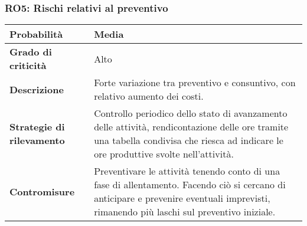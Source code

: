 \noindent\begin{minipage}{\textwidth}
\subsubsection{RO5: Rischi relativi al preventivo}
    
\bgroup
\begin{adjustwidth}{-0.5cm}{-0.5cm}
    \begin{longtable}{P{4.5cm}|>{\justifying \arraybackslash}P{9cm}}

        \textbf{Probabilità} & Media \\
        \hline
        \textbf{Grado di criticità} & Alto \\
        \hline
        \textbf{Descrizione} & Forte variazione tra preventivo e consuntivo, con relativo aumento
        dei costi. \\
        \hline
        \textbf{Strategie di rilevamento} &  Controllo periodico dello stato di avanzamento delle
        attività, rendicontazione delle ore tramite una tabella condivisa che riesca ad indicare le ore produttive svolte nell'attività. \\
        \hline
        \textbf{Contromisure} & Preventivare le attività tenendo conto di una fase di allentamento. Facendo ciò si cercano di anticipare e prevenire eventuali imprevisti, rimanendo più laschi sul preventivo iniziale. 
    \end{longtable}
\end{adjustwidth}
\egroup
\end{minipage}